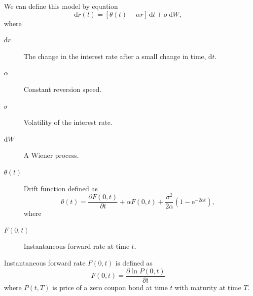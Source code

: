 \documentclass[a4paper,12pt]{report}
\theoremstyle{definition} \newtheorem{definice}[veta]{Definice}
\theoremstyle{remark}
\begin{document}
We can define this model by equation
\begin{equation}
\mathrm{d}r(t)=[\theta(t)-\alpha r]\,\mathrm{d}t+\sigma\,\mathrm{d}W,
\label{H-Wmodel}
\end{equation}
where
\begin{description}
\item [$\mathrm{d}r$] The change in the interest rate after a small change in time, $\mathrm{d}t$.
\item [$\alpha$   ] Constant reversion speed.%
\item [$\sigma$   ] Volatility of the interest rate.
\item [$\mathrm{d}W$] A Wiener process.
\item [$\theta(t)$] Drift function defined as
\begin{equation}
\theta(t)=\frac{\partial  F(0,t)}{\partial t}+\alpha F(0,t)+\frac{\sigma^2}{2 \alpha}(1-\mathrm{e}^{-2\alpha t}), %
\end{equation}
where
\item[$F(0,t)$] Instantaneous forward rate at time $t$.
\end{description}
Instantaneous forward rate $F(0,t)$ is defined as
\begin{equation}
F(0,t)= \frac{\partial\ln  P(0,t)}{\partial t}
\end{equation}
where $ P(t,T)$ is price of a zero coupon bond at time $t$ with maturity at time $T$.
\end{document}
